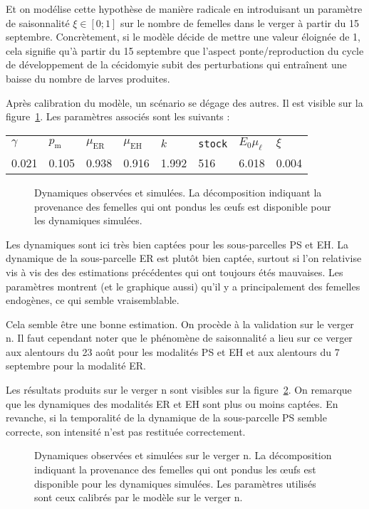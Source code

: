 Et on modélise cette hypothèse de manière radicale en introduisant un paramètre de saisonnalité $\xi \in [0;1]$ sur le nombre de femelles dans le verger à partir du 15 septembre.
Concrètement, si le modèle décide de mettre une valeur éloignée de 1, cela signifie qu'à partir du 15 septembre que l'aspect ponte/reproduction du cycle de développement de la cécidomyie subit des perturbations qui entraînent une baisse du nombre de larves produites.

Après calibration du modèle, un scénario se dégage des autres.
Il est visible sur la figure~\ref{fig:D}.
Les paramètres associés sont les suivants :
\begin{center}
\begin{tabular}{llllllll}
$\gamma$ & $p_{\text{m}}$ & $\mu_{\text{ER}}$ & $\mu_{\text{EH}}$ & $k$ & \texttt{stock} & $E_0\mu_{\ell}$ & $\xi$\\
0.021 & 0.105 & 0.938 & 0.916 & 1.992 & 516 & 6.018 & 0.004
\end{tabular}
\end{center}


\begin{figure}[ht]
 \centering
 \caption{Dynamiques observées et simulées. La décomposition indiquant la provenance des femelles qui ont pondus les œufs est disponible pour les dynamiques simulées.}
 \label{fig:D}
\end{figure}


Les dynamiques sont ici très bien captées pour les sous-parcelles PS et EH.
La dynamique de la sous-parcelle ER est plutôt bien captée, surtout si l'on relativise vis à vis des des estimations précédentes qui ont toujours étés mauvaises.
Les paramètres montrent (et le graphique aussi) qu'il y a principalement des femelles endogènes, ce qui semble vraisemblable.



Cela semble être une bonne estimation.
On procède à la validation sur le verger n.
Il faut cependant noter que le phénomène de saisonnalité a lieu sur ce verger aux alentours du 23 août pour les modalités PS et EH et aux alentours du 7 septembre pour la modalité ER.

Les résultats produits sur le verger n sont visibles sur la figure~\ref{fig:D2}.
On remarque que les dynamiques des modalités ER et EH sont plus ou moins captées.
En revanche, si la temporalité de la dynamique de la sous-parcelle PS semble correcte, son intensité n'est pas restituée correctement.
\begin{figure}[ht]
 \centering
 \caption{Dynamiques observées et simulées sur le verger n. La décomposition indiquant la provenance des femelles qui ont pondus les œufs est disponible pour les dynamiques simulées.
 Les paramètres utilisés sont ceux calibrés par le modèle sur le verger n.}
 \label{fig:D2}
\end{figure}



